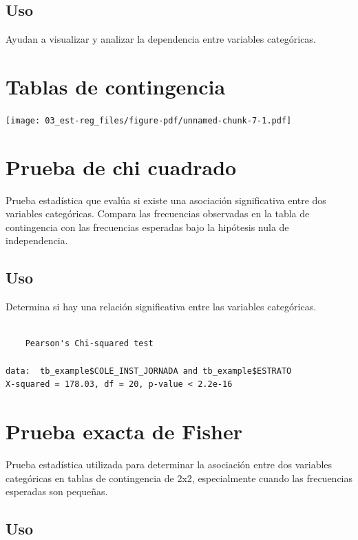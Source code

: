 \documentclass[
  letterpaper,
  DIV=11,
  numbers=noendperiod]{scrreprt}
\begin{document}
\subsection{Uso}\label{uso-1}

Ayudan a visualizar y analizar la dependencia entre variables
categóricas.

\section{Tablas de contingencia}\label{tablas-de-contingencia-1}

\texttt{[image: 03\_est-reg\_files/figure-pdf/unnamed-chunk-7-1.pdf]}

\section{Prueba de chi cuadrado}\label{prueba-de-chi-cuadrado}

Prueba estadística que evalúa si existe una asociación significativa
entre dos variables categóricas. Compara las frecuencias observadas en
la tabla de contingencia con las frecuencias esperadas bajo la hipótesis
nula de independencia.

\subsection{Uso}\label{uso-2}

Determina si hay una relación significativa entre las variables
categóricas.

\begin{verbatim}

    Pearson's Chi-squared test

data:  tb_example$COLE_INST_JORNADA and tb_example$ESTRATO
X-squared = 178.03, df = 20, p-value < 2.2e-16
\end{verbatim}

\section{Prueba exacta de Fisher}\label{prueba-exacta-de-fisher}

Prueba estadística utilizada para determinar la asociación entre dos
variables categóricas en tablas de contingencia de 2x2, especialmente
cuando las frecuencias esperadas son pequeñas.

\subsection{Uso}\label{uso-3}
\end{document}
